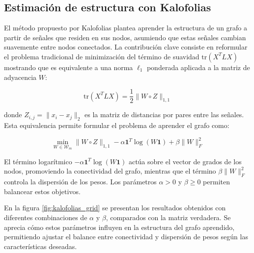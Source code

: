 \documentclass{article}
\begin{document}
\subsection{Estimación de estructura con Kalofolias}
El método propuesto por Kalofolias plantea aprender la estructura de un grafo a partir de señales que residen en sus nodos, asumiendo que estas señales cambian suavemente entre nodos conectados. La contribución clave consiste en reformular el problema tradicional de minimización del término de suavidad $\text{tr}(X^T L X)$ mostrando que es equivalente a una norma $\ell_1$ ponderada aplicada a la matriz de adyacencia $W$:

\begin{equation}
\text{tr}(X^T L X) = \frac{1}{2} \|W \circ Z\|_{1,1}
\end{equation}

donde $Z_{i,j} = \|x_i - x_j\|_2$ es la matriz de distancias por pares entre las señales. Esta equivalencia permite formular el problema de aprender el grafo como:

\begin{equation}
\min_{W \in \mathcal{W}_m} \|W \circ Z\|_{1,1} - \alpha \mathbf{1}^T \log(W \mathbf{1}) + \beta \|W\|_F^2
\end{equation}

El término logarítmico $-\alpha \mathbf{1}^T \log(W \mathbf{1})$ actúa sobre el vector de grados de los nodos, promoviendo la conectividad del grafo, mientras que el término $\beta \|W\|_F^2$ controla la dispersión de los pesos. Los parámetros $\alpha > 0$ y $\beta \geq 0$ permiten balancear estos objetivos.

En la figura \ref{fig:kalofolias_grid} se presentan los resultados obtenidos con diferentes combinaciones de $\alpha$ y $\beta$, comparados con la matriz verdadera. Se aprecia cómo estos parámetros influyen en la estructura del grafo aprendido, permitiendo ajustar el balance entre conectividad y dispersión de pesos según las características deseadas.
\end{document}
